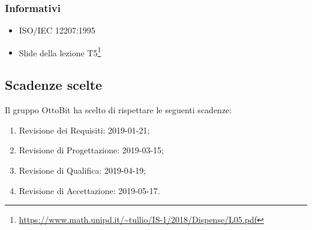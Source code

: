 	\subsubsection{Informativi}
		\begin{itemize}
			\item ISO/IEC 12207:1995
			\item Slide della lezione T5\footnote{\url{https://www.math.unipd.it/~tullio/IS-1/2018/Dispense/L05.pdf}}
		\end{itemize}

\subsection{Scadenze scelte}
	Il gruppo OttoBit ha scelto di rispettare le seguenti scadenze:
	\begin{enumerate}
		\item Revisione dei Requisiti: 2019-01-21;
		\item Revisione di Progettazione: 2019-03-15;
		\item Revisione di Qualifica: 2019-04-19;
		\item Revisione di Accettazione: 2019-05-17.
	\end{enumerate}